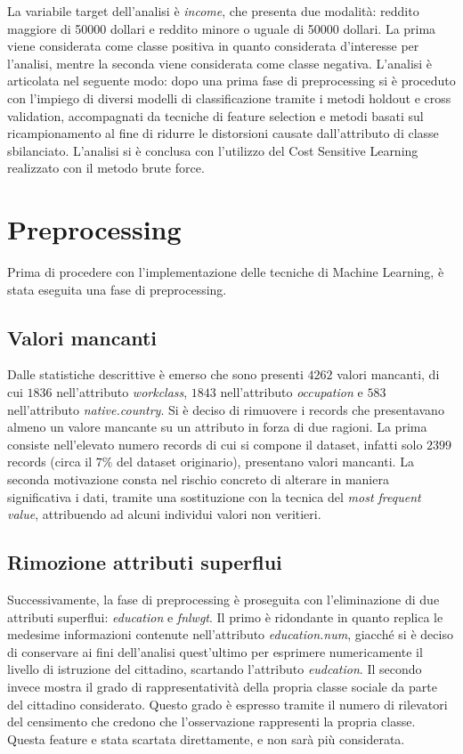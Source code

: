 \documentclass[fleqn,10pt]{SelfArx}
\begin{document}
La variabile target dell'analisi è \textit{income}, che presenta due modalità: reddito maggiore di \num{50000} dollari e reddito minore o uguale di \num{50000} dollari. La prima viene considerata come classe positiva in quanto considerata d'interesse per l'analisi, mentre la seconda viene considerata come classe negativa.
L'analisi è articolata nel seguente modo: dopo una prima fase di preprocessing si è proceduto con l'impiego di diversi modelli di classificazione tramite i metodi holdout e cross validation, accompagnati da tecniche di feature selection e metodi basati sul ricampionamento al fine di ridurre le distorsioni causate dall'attributo di classe sbilanciato. L'analisi si è conclusa con l'utilizzo del Cost Sensitive Learning realizzato con il metodo brute force.




\section{Preprocessing}
Prima di procedere con l'implementazione delle tecniche di Machine Learning, è stata eseguita una fase di preprocessing. 
\subsection{Valori mancanti}
Dalle statistiche descrittive è emerso che sono presenti $\num{4262}$ valori mancanti, di cui $\num{1836}$ nell'attributo \textit{workclass}, $\num{1843}$ nell'attributo \textit{occupation} e $\num{583}$ nell'attributo \textit{native.country}. Si è deciso di rimuovere i records che presentavano almeno un valore mancante su un attributo in forza di due ragioni. La prima consiste nell'elevato numero records di cui si compone il dataset, infatti solo $\num{2399}$ records (circa il $7\%$ del dataset originario), presentano valori mancanti. La seconda motivazione consta nel rischio concreto di alterare in maniera significativa i dati, tramite una sostituzione con la tecnica del \textit{most frequent value}, attribuendo ad alcuni individui valori non veritieri.
\subsection{Rimozione attributi superflui}
Successivamente, la fase di preprocessing è proseguita con l'eliminazione di due attributi superflui: \textit{education} e \textit{fnlwgt}. Il primo è ridondante in quanto replica le medesime informazioni contenute nell'attributo \textit{education.num}, giacché si è deciso di conservare ai fini dell'analisi quest'ultimo per esprimere numericamente il livello di istruzione del cittadino, scartando l'attributo \textit{eudcation}. Il secondo invece mostra il grado di rappresentatività della propria classe sociale da parte del cittadino considerato. Questo grado è espresso tramite il numero di rilevatori del censimento che credono che l’osservazione rappresenti la propria classe. Questa feature e stata scartata direttamente, e non sarà più considerata.
\end{document}
